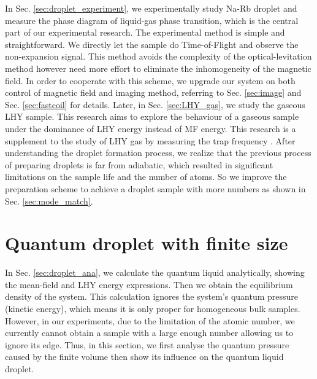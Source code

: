 In Sec. \ref{sec:droplet_experiment}, we experimentally study Na-Rb droplet and measure the phase diagram of liquid-gas phase transition, which is the central part of our experimental research. The experimental method is simple and straightforward. We directly let the sample do Time-of-Flight and observe the non-expansion signal. This method avoids the complexity of the optical-levitation method however need more effort to eliminate the inhomogeneity of the magnetic field. In order to cooperate with this scheme, we upgrade our system on both control of magnetic field and imaging method, referring to Sec. \ref{sec:image} and Sec. \ref{sec:fastcoil} for details. Later, in Sec. \ref{sec:LHY_gas}, we study the gaseous LHY sample. This research aims to explore the behaviour of a gaseous sample under the dominance of LHY energy instead of MF energy. This research is a supplement to the study of LHY gas by measuring the trap frequency \cite{skov2020}. After understanding the droplet formation process, we realize that the previous process of preparing droplets is far from adiabatic, which resulted in significant limitations on the sample life and the number of atoms. So we improve the preparation scheme to achieve a droplet sample with more numbers as shown in Sec. \ref{sec:mode_match}. 


\section{Quantum droplet with finite size}
\label{sec:finite_size}

In Sec. \ref{sec:droplet_ana}, we calculate the quantum liquid analytically, showing the mean-field and LHY energy expressions. Then we obtain the equilibrium density of the system. This calculation ignores the system's quantum pressure (kinetic energy), which means it is only proper for homogeneous bulk samples. However, in our experiments, due to the limitation of the atomic number, we currently cannot obtain a sample with a large enough number allowing us to ignore its edge. Thus, in this section, we first analyse the quantum pressure caused by the finite volume then show its influence on the quantum liquid droplet. 

